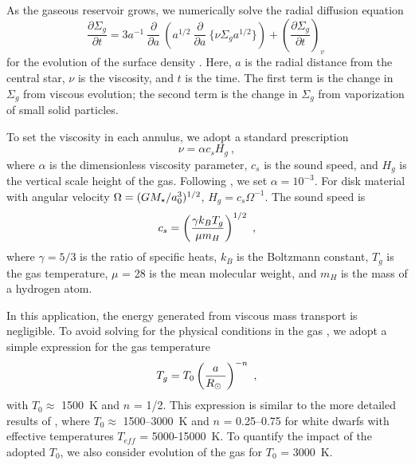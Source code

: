 \documentclass[12pt,preprint]{aastex}
\begin{document}
As the gaseous reservoir grows, we numerically solve the radial diffusion equation
\citep{lbp1974,pri1981}
\begin{equation}
\frac{\partial \Sigma_g}{\partial t} = 3 a^{-1}~\frac{\partial}{\partial a} ~ \left ( a^{1/2}~\frac{\partial}{\partial a} ~ \{ \nu \Sigma_g a^{1/2} \} \right ) + \left ( \frac{\partial \Sigma_g}{\partial t} \right )_v ~
\label{eq: disk-evol}
\end{equation}
for the evolution of the surface density \citep[see also][]{bk2011a}. Here, $a$ 
is the radial distance from the central star, $\nu$ is the viscosity, and $t$ 
is the time.  The first term is the change in $\Sigma_g$ from viscous evolution; the 
second term is the change in $\Sigma_g$ from vaporization of small solid particles. 

To set the viscosity in each annulus, we adopt a standard prescription
\begin{equation}
\nu = \alpha c_s H_g ~ ,
\label{eq: disk-nu}
\end{equation}
where $\alpha$ is the dimensionless viscosity parameter, $c_s$ is the sound speed,
and $H_g$ is the vertical scale height of the gas. Following \citet{metzger2012}, 
we set $\alpha = 10^{-3}$.  For disk material with angular velocity 
$\Omega = (G \mstar / a_0^3)^{1/2}$, $H_g = c_s \Omega^{-1}$. The sound speed is 
\begin{equation}
c_s = \left ( { \gamma k_B T_g \over \mu m_H } \right )^{1/2} ~ ,
\label{eq: disk-cs}
\end{equation}
where $\gamma = 5/3$ is the ratio of specific heats, $k_B$ is the Boltzmann constant,
$T_g$ is the gas temperature, $\mu$ = 28 is the mean molecular weight, and $m_H$ is 
the mass of a hydrogen atom.

In this application, the energy generated from viscous mass transport is negligible. 
To avoid solving for the physical conditions in the gas \citep[e.g.,][]{melis2010b}, 
we adopt a simple expression for the gas temperature
\begin{equation}
T_g = T_0 \left ( { a  \over \rsun\ } \right )^{-n} ~ ,
\label{eq: disk-temp}
\end{equation}
with $T_0 \approx$ 1500~K and $n$ = 1/2. This expression is similar to the more 
detailed results of \citet{melis2010b}, where $T_0 \approx$ 1500--3000~K and
$n$ = 0.25--0.75 for white dwarfs with effective temperatures $T_{eff}$ = 
5000-15000~K.  To quantify the impact of the adopted $T_0$, we also consider 
evolution of the gas for $T_0$ = 3000~K.
\end{document}
